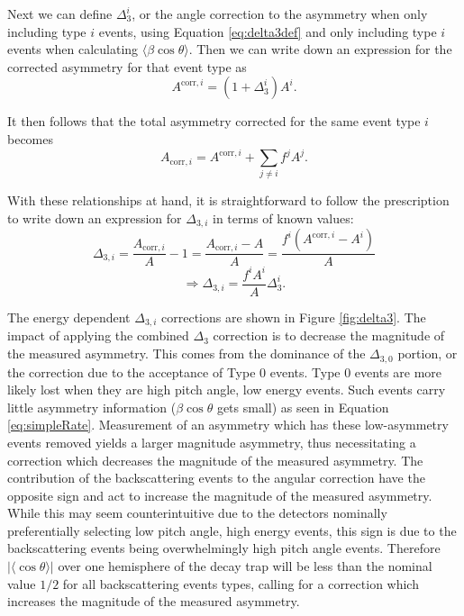 Next we can define $\Delta^i_3$, or the angle correction to the asymmetry when only
including type $i$ events, using Equation \ref{eq:delta3def} and only including
type $i$ events when calculating $\langle\beta\cos\theta\rangle$. Then we can write down
an expression for the corrected asymmetry for that event type as
%
\begin{equation}
A^{\mathrm{corr},i} = (1+\Delta^i_3)A^i.
\end{equation}

It then follows that the total asymmetry corrected for the same event type $i$ becomes
%
\begin{equation}
A_{\mathrm{corr},i} = A^{\mathrm{corr},i} + \sum_{j\neq i} f^jA^j.
\end{equation}

With these relationships at hand, it is straightforward to follow the prescription to write
down an expression for $\Delta_{3,i}$ in terms of known values:
%
\begin{equation*}
  \Delta_{3,i} = \frac{A_{\mathrm{corr},i}}{A} - 1 = \frac{A_{\mathrm{corr},i}-A}{A} =
  \frac{f^i(A^{\mathrm{corr},i}-A^i)}{A}
\end{equation*}
%
\begin{equation}
  \Rightarrow\Delta_{3,i} = \frac{f^iA^i}{A}\Delta^i_3.
\end{equation}
%

The energy dependent $\Delta_{3,i}$ corrections are shown in Figure \ref{fig:delta3}.
The impact of applying the combined $\Delta_{3}$ correction is to decrease the magnitude of the
measured asymmetry. This comes from the dominance of the $\Delta_{3,0}$ portion, or the correction
due to the acceptance of Type 0 events. Type 0 events are more likely lost when they are high pitch
angle, low energy events. Such events carry little asymmetry information ($\beta\cos\theta$ gets small)
as seen in Equation \ref{eq:simpleRate}. Measurement of an asymmetry which has these low-asymmetry events
removed yields a larger magnitude asymmetry, thus necessitating a correction which decreases the
magnitude of the measured asymmetry. The contribution of the backscattering events to the angular
correction have the opposite sign and act to increase the magnitude of the measured asymmetry.
While this may seem counterintuitive due to the detectors nominally preferentially selecting
low pitch angle, high energy events, this sign is due to the backscattering events being overwhelmingly
high pitch angle events. Therefore $|\langle\cos\theta\rangle|$ over one hemisphere of the decay trap
will be less than the nominal value $1/2$ for all
backscattering events types, calling for a correction which increases the magnitude of the measured
asymmetry.

